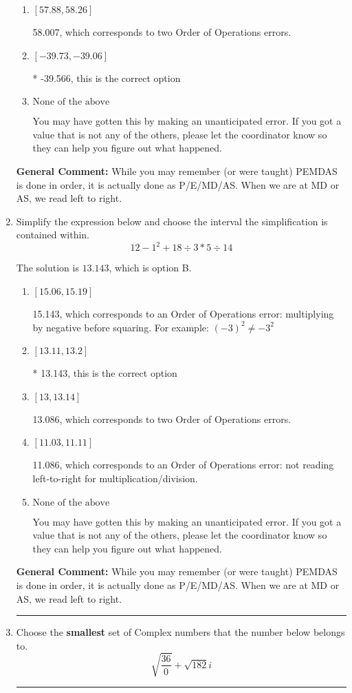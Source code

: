 \documentclass{extbook}[14pt]
\newcommand{\litem}[1]{\item #1

\rule{\textwidth}{0.4pt}}
\begin{document}
\begin{enumerate}
{\begin{enumerate}[label=\Alph*.]
 -39.993, which corresponds to an Order of Operations error: not reading left-to-right for multiplication/division.
\item \( [57.88, 58.26] \)

 58.007, which corresponds to two Order of Operations errors.
\item \( [-39.73, -39.06] \)

* -39.566, this is the correct option
\item \( \text{None of the above} \)

 You may have gotten this by making an unanticipated error. If you got a value that is not any of the others, please let the coordinator know so they can help you figure out what happened.
\end{enumerate}

\textbf{General Comment:} While you may remember (or were taught) PEMDAS is done in order, it is actually done as P/E/MD/AS. When we are at MD or AS, we read left to right.
}
\litem{
Simplify the expression below and choose the interval the simplification is contained within.
\[ 12 - 1^2 + 18 \div 3 * 5 \div 14 \]

The solution is \( 13.143 \), which is option B.\begin{enumerate}[label=\Alph*.]
\item \( [15.06, 15.19] \)

 15.143, which corresponds to an Order of Operations error: multiplying by negative before squaring. For example: $(-3)^2 \neq -3^2$
\item \( [13.11, 13.2] \)

* 13.143, this is the correct option
\item \( [13, 13.14] \)

 13.086, which corresponds to two Order of Operations errors.
\item \( [11.03, 11.11] \)

 11.086, which corresponds to an Order of Operations error: not reading left-to-right for multiplication/division.
\item \( \text{None of the above} \)

 You may have gotten this by making an unanticipated error. If you got a value that is not any of the others, please let the coordinator know so they can help you figure out what happened.
\end{enumerate}

\textbf{General Comment:} While you may remember (or were taught) PEMDAS is done in order, it is actually done as P/E/MD/AS. When we are at MD or AS, we read left to right.
}
\litem{
Choose the \textbf{smallest} set of Complex numbers that the number below belongs to.
\[ \sqrt{\frac{36}{0}}+\sqrt{182} i \]

}
\end{enumerate}
\end{document}
